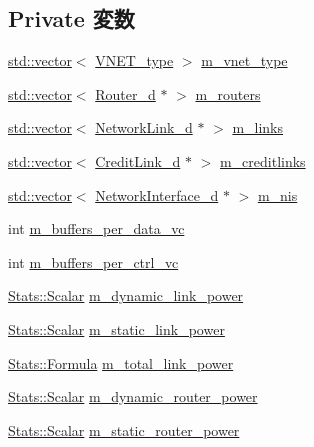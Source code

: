 \subsection*{Private 変数}
\begin{DoxyCompactItemize}
\item 
\hyperlink{classstd_1_1vector}{std::vector}$<$ \hyperlink{NetworkHeader_8hh_a101d399ed954ebfe3619308e600de4d3}{VNET\_\-type} $>$ \hyperlink{classGarnetNetwork__d_a1ec4cc76a3ec5a7f50db8e24ffa2af31}{m\_\-vnet\_\-type}
\item 
\hyperlink{classstd_1_1vector}{std::vector}$<$ \hyperlink{classRouter__d}{Router\_\-d} $\ast$ $>$ \hyperlink{classGarnetNetwork__d_aed8dfdf9e7fa37c41a97236a1bfd37bc}{m\_\-routers}
\item 
\hyperlink{classstd_1_1vector}{std::vector}$<$ \hyperlink{classNetworkLink__d}{NetworkLink\_\-d} $\ast$ $>$ \hyperlink{classGarnetNetwork__d_aface9a1304078accd7e62fe4949be8bd}{m\_\-links}
\item 
\hyperlink{classstd_1_1vector}{std::vector}$<$ \hyperlink{classCreditLink__d}{CreditLink\_\-d} $\ast$ $>$ \hyperlink{classGarnetNetwork__d_abaf2a1a10e56b52de94d5df2f2ed6b9b}{m\_\-creditlinks}
\item 
\hyperlink{classstd_1_1vector}{std::vector}$<$ \hyperlink{classNetworkInterface__d}{NetworkInterface\_\-d} $\ast$ $>$ \hyperlink{classGarnetNetwork__d_a8b81ce944f8d34848f85095dd550c55d}{m\_\-nis}
\item 
int \hyperlink{classGarnetNetwork__d_a5c5d4ec36c9e0d1b9706b34909cce852}{m\_\-buffers\_\-per\_\-data\_\-vc}
\item 
int \hyperlink{classGarnetNetwork__d_a800b6444deb08b282d4fe86c1cba0447}{m\_\-buffers\_\-per\_\-ctrl\_\-vc}
\item 
\hyperlink{classStats_1_1Scalar}{Stats::Scalar} \hyperlink{classGarnetNetwork__d_aadc5d55f515c710c3fa109bf4e619890}{m\_\-dynamic\_\-link\_\-power}
\item 
\hyperlink{classStats_1_1Scalar}{Stats::Scalar} \hyperlink{classGarnetNetwork__d_acd9f02f6c765ee4db26c1c1e341dfb45}{m\_\-static\_\-link\_\-power}
\item 
\hyperlink{classStats_1_1Formula}{Stats::Formula} \hyperlink{classGarnetNetwork__d_a51acbf07bcbf0b0f29775540cab885ec}{m\_\-total\_\-link\_\-power}
\item 
\hyperlink{classStats_1_1Scalar}{Stats::Scalar} \hyperlink{classGarnetNetwork__d_ab1699dd647c461de4970b8becf2953e7}{m\_\-dynamic\_\-router\_\-power}
\item 
\hyperlink{classStats_1_1Scalar}{Stats::Scalar} \hyperlink{classGarnetNetwork__d_a62edd4b793625655e794cce0c11522c6}{m\_\-static\_\-router\_\-power}

\end{DoxyCompactItemize}
